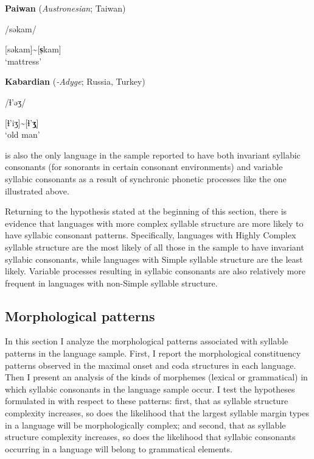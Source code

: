 \ea\label{ex:3.19}
  \textbf{Paiwan} (\textit{Austronesian}; Taiwan)

/səkam/

[səkam]{\textasciitilde}[\textbf{s̩}kam]\\
\glt ‘mattress’
\citep[41]{Chang2006}
\z

\ea\label{ex:3.20}
  \textbf{Kabardian} (\textit{-Adyge}; Russia, Turkey)

/ɬ{}'əʒ/

[ɬ’iʒ]{\textasciitilde}[ɬ{}'\textbf{ʒ̩}]\\
\glt ‘old man’
\citep[24]{Kuipers1960}
\z

 is also the only language in the sample reported to have both invariant syllabic consonants (for sonorants in certain consonant environments) and variable syllabic consonants as a result of synchronic phonetic processes like the one illustrated above.

  Returning to the hypothesis stated at the beginning of this section, there is evidence that languages with more complex syllable structure are more likely to have syllabic consonant patterns. Specifically, languages with Highly Complex syllable structure are the most likely of all those in the sample to have invariant syllabic consonants, while languages with Simple syllable structure are the least likely. Variable processes resulting in syllabic consonants are also relatively more frequent in languages with non-Simple syllable structure.

\subsection{Morphological patterns}\label{sec:3.3.6}

  In this section I analyze the morphological patterns associated with syllable patterns in the language sample. First, I report the morphological constituency patterns observed in the maximal onset and coda structures in each language. Then I present an analysis of the kinds of morphemes (lexical or grammatical) in which syllabic consonants in the language sample occur. I test the hypotheses formulated in  with respect to these patterns: first, that as syllable structure complexity increases, so does the likelihood that the largest syllable margin types in a language will be morphologically complex; and second, that as syllable structure complexity increases, so does the likelihood that syllabic consonants occurring in a language will belong to grammatical elements.

